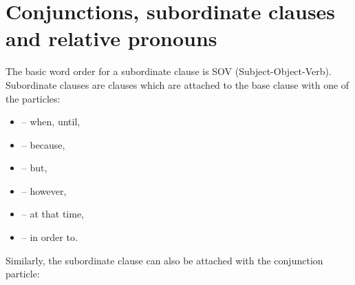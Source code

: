 






\section{Conjunctions, subordinate clauses and relative pronouns}
\label{sec:conjunctions}

The basic word order for a subordinate clause is SOV (Subject-Object-Verb).
Subordinate clauses are clauses which are attached to the base clause with one
of the particles:

\begin{itemize}
    \item {} -- when, until,
    \item {} -- because,
    \item {} -- but,
    \item {} -- however,
    \item {} -- at that time,
    \item {} -- in order to.
\end{itemize}

Similarly, the subordinate clause can also be attached with the conjunction
particle:

